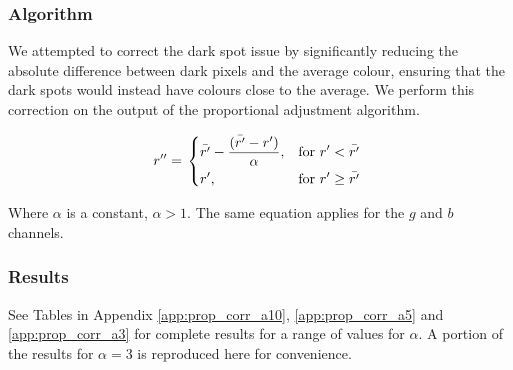 \subsubsection*{Algorithm}
We attempted to correct the dark spot issue by significantly reducing the absolute difference between dark pixels and the average colour, ensuring that the dark spots would instead have colours close to the average. We perform this correction on the output of the proportional adjustment algorithm.

\begin{equation} \label{eq:prop_corr_algo}
  r'' = \left.
  \begin{dcases}
    \displaystyle \bar{r'} - \frac{(\bar{r'} - r')}{\alpha}, & \text{for } r' < \bar{r'} \\
    \displaystyle r', & \text{for } r' \geq \bar{r'} \\
  \end{dcases}
  \right.\\
\end{equation}


Where $\alpha$ is a constant, $\alpha  > 1$. The same equation applies for the $g$ and $b$ channels.

\subsubsection*{Results}
See Tables in Appendix \ref{app:prop_corr_a10}, \ref{app:prop_corr_a5} and \ref{app:prop_corr_a3} for complete results for a range of values for $\alpha$. A portion of the results for $\alpha = 3$ is reproduced here for convenience.

